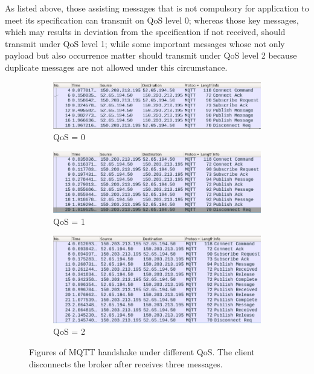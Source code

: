 \documentclass[12pt, letterpaper]{article}
\begin{document}
As listed above, those assisting messages that is not compulsory for application to meet its specification can transmit on QoS level 0; whereas those key messages, which may results in deviation from the specification if not received, should transmit under QoS level 1; while some important messages whose not only payload but also occurrence matter should transmit under QoS level 2 because duplicate messages are not allowed under this circumstance.

\begin{figure}
	\centering
	\begin{subfigure}[t]{0.77\textwidth}
		\centering
		\includegraphics[width=\textwidth]{wire_shark/handshake-q0}
		\caption{QoS = 0}
	\end{subfigure}
	
	\begin{subfigure}[t]{0.77\textwidth}
		\centering
		\includegraphics[width=\textwidth]{wire_shark/handshake-q1}
		\caption{QoS = 1}
	\end{subfigure}
	
	\begin{subfigure}[t]{0.77\textwidth}
		\centering
		\includegraphics[width=\textwidth]{wire_shark/handshake-q2}
		\caption{QoS = 2}
	\end{subfigure}

	\caption{Figures of MQTT handshake under different QoS. The client disconnects the broker after receives three messages.}
	\label{fig:handshake_snap_shot}
\end{figure}
\end{document}
